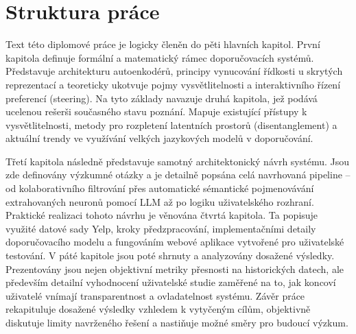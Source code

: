 \section*{Struktura práce}
Text této diplomové práce je logicky členěn do pěti hlavních kapitol. První kapitola definuje formální a matematický rámec doporučovacích systémů. Představuje architekturu autoenkodérů, principy vynucování řídkosti u skrytých reprezentací a teoreticky ukotvuje pojmy vysvětlitelnosti a interaktivního řízení preferencí (steering). Na tyto základy navazuje druhá kapitola, jež podává ucelenou rešerši současného stavu poznání. Mapuje existující přístupy k vysvětlitelnosti, metody pro rozpletení latentních prostorů (disentanglement) a aktuální trendy ve využívání velkých jazykových modelů v doporučování. 

Třetí kapitola následně představuje samotný architektonický návrh systému. Jsou zde definovány výzkumné otázky a je detailně popsána celá navrhovaná pipeline – od kolaborativního filtrování přes automatické sémantické pojmenovávání extrahovaných neuronů pomocí LLM až po logiku uživatelského rozhraní. Praktické realizaci tohoto návrhu je věnována čtvrtá kapitola. Ta popisuje využité datové sady Yelp, kroky předzpracování, implementačními detaily doporučovacího modelu a fungováním webové aplikace vytvořené pro uživatelské testování. V páté kapitole jsou poté shrnuty a analyzovány dosažené výsledky. Prezentovány jsou nejen objektivní metriky přesnosti na historických datech, ale především detailní vyhodnocení uživatelské studie zaměřené na to, jak koncoví uživatelé vnímají transparentnost a ovladatelnost systému. Závěr práce rekapituluje dosažené výsledky vzhledem k vytyčeným cílům, objektivně diskutuje limity navrženého řešení a nastiňuje možné směry pro budoucí výzkum.
